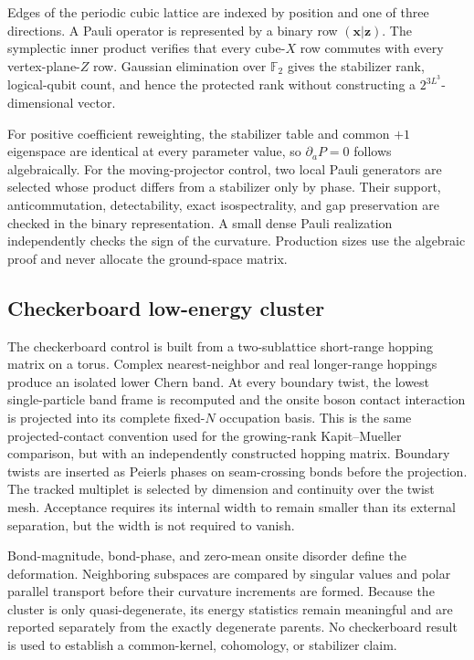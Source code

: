 Edges of the periodic cubic lattice are indexed by position and one of three
directions.  A Pauli operator is represented by a binary row $(\bm x|\bm z)$.
The symplectic inner product verifies that every cube-$X$ row commutes with
every vertex-plane-$Z$ row.  Gaussian elimination over $\mathbb F_2$ gives the
stabilizer rank, logical-qubit count, and hence the protected rank without
constructing a $2^{3L^3}$-dimensional vector.

For positive coefficient reweighting, the stabilizer table and common $+1$
eigenspace are identical at every parameter value, so $\partial_aP=0$ follows
algebraically.  For the moving-projector control, two local Pauli generators
are selected whose product differs from a stabilizer only by phase.  Their
support, anticommutation, detectability, exact isospectrality, and gap
preservation are checked in the binary representation.  A small dense Pauli
realization independently checks the sign of the curvature.  Production
sizes use the algebraic proof and never allocate the ground-space matrix.

\subsection{Checkerboard low-energy cluster}

The checkerboard control is built from a two-sublattice short-range hopping
matrix on a torus.  Complex nearest-neighbor and real longer-range hoppings
produce an isolated lower Chern band.  At every boundary twist, the lowest
single-particle band frame is recomputed and the onsite boson contact
interaction is projected into its complete fixed-$N$ occupation basis.  This
is the same projected-contact convention used for the growing-rank
Kapit--Mueller comparison, but with an independently constructed hopping
matrix.  Boundary twists are inserted as Peierls phases on seam-crossing bonds
before the projection.  The tracked multiplet is selected by dimension and
continuity over the twist mesh.  Acceptance requires its internal width to
remain smaller than its external separation, but the width is not required to
vanish.

Bond-magnitude, bond-phase, and zero-mean onsite disorder define the
deformation.  Neighboring subspaces are compared by singular values and polar
parallel transport before their curvature increments are formed.  Because the
cluster is only quasi-degenerate, its energy statistics remain meaningful and
are reported separately from the exactly degenerate parents.  No checkerboard
result is used to establish a common-kernel, cohomology, or stabilizer claim.
